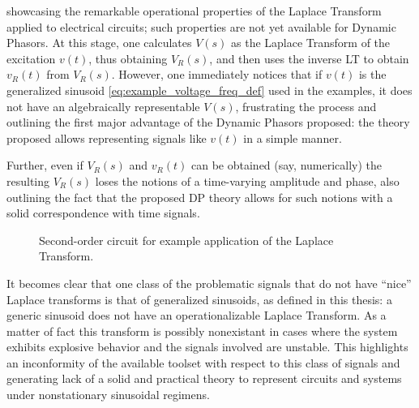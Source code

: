 	\noindent showcasing the remarkable operational properties of the Laplace Transform applied to electrical circuits; such properties are not yet available for Dynamic Phasors. At this stage, one calculates $V(s)$ as the Laplace Transform of the excitation $v(t)$, thus obtaining $V_R(s)$, and then uses the inverse LT to obtain $v_R(t)$ from $V_R(s)$. However, one immediately notices that if $v(t)$ is the generalized sinusoid \eqref{eq:example_voltage_freq_def} used in the examples, it does not have an algebraically representable $V(s)$, frustrating the process and outlining the first major advantage of the Dynamic Phasors proposed: the theory proposed allows representing signals like $v(t)$ in a simple manner.

	Further, even if $V_R(s)$ and $v_R(t)$ can be obtained (say, numerically) the resulting $V_R(s)$ loses the notions of a time-varying amplitude and phase, also outlining the fact that the proposed DP theory allows for such notions with a solid correspondence with time signals.

\begin{figure}[h]
\centering
	\caption{Second-order circuit for example application of the Laplace Transform.}
	\label{fig:laplace_example}
\end{figure} %
	
	It becomes clear that one class of the problematic signals that do not have ``nice'' Laplace transforms is that of generalized sinusoids, as defined in this thesis: a generic sinusoid does not have an operationalizable Laplace Transform. As a matter of fact this transform is possibly nonexistant in cases where the system exhibits explosive behavior and the signals involved are unstable. This highlights an inconformity of the available toolset with respect to this class of signals and generating lack of a solid and practical theory to represent circuits and systems under nonstationary sinusoidal regimens. 

